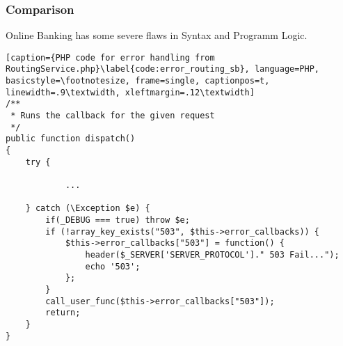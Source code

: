 \subsubsection{Comparison}
Online Banking has some severe flaws in Syntax and Programm Logic.

\clearpage

\begin{lstlisting}[caption={PHP code for error handling from RoutingService.php}\label{code:error_routing_sb}, language=PHP, basicstyle=\footnotesize, frame=single, captionpos=t, linewidth=.9\textwidth, xleftmargin=.12\textwidth]
/**
 * Runs the callback for the given request
 */
public function dispatch()
{
    try {

            ...

    } catch (\Exception $e) {
        if(_DEBUG === true) throw $e;
        if (!array_key_exists("503", $this->error_callbacks)) {
            $this->error_callbacks["503"] = function() {
                header($_SERVER['SERVER_PROTOCOL']." 503 Fail...");
                echo '503';
            };
        }
        call_user_func($this->error_callbacks["503"]);
        return;
    }
}
\end{lstlisting}

